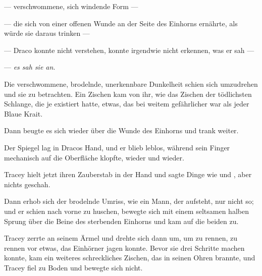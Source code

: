 — verschwommene, sich windende Form —

— die sich von einer offenen Wunde an der Seite des Einhorns ernährte, als würde sie daraus trinken —

— Draco konnte nicht verstehen, konnte irgendwie nicht erkennen, was er sah —

— \emph{es sah sie an}.

Die verschwommene, brodelnde, unerkennbare Dunkelheit schien sich umzudrehen und sie zu betrachten. Ein Zischen kam von ihr, wie das Zischen der tödlichsten Schlange, die je existiert hatte, etwas, das bei weitem gefährlicher war als jeder Blaue Krait.

Dann beugte es sich wieder über die Wunde des Einhorns und trank weiter.

Der Spiegel lag in Dracos Hand, und er blieb leblos, während sein Finger mechanisch auf die Oberfläche klopfte, wieder und wieder.

Tracey hielt jetzt ihren Zauberstab in der Hand und sagte Dinge wie  und , aber nichts geschah.

Dann erhob sich der brodelnde Umriss, wie ein Mann, der aufsteht, nur nicht so; und er schien nach vorne zu huschen, bewegte sich mit einem seltsamen halben Sprung über die Beine des sterbenden Einhorns und kam auf die beiden zu.

Tracey zerrte an seinem Ärmel und drehte sich dann um, um zu rennen, zu rennen vor etwas, das Einhörner jagen konnte. Bevor sie drei Schritte machen konnte, kam ein weiteres schreckliches Zischen, das in seinen Ohren brannte, und Tracey fiel zu Boden und bewegte sich nicht.

